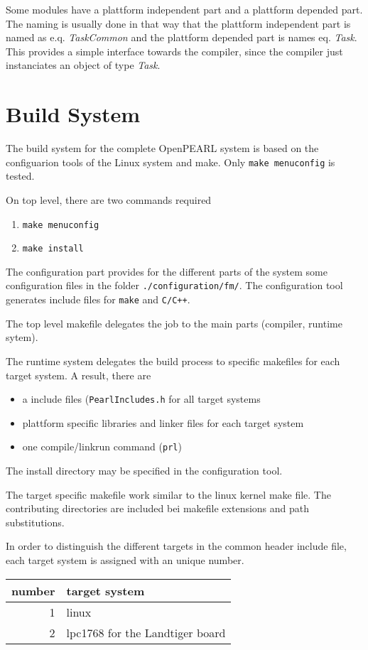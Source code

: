 Some modules have a plattform independent part and a plattform
depended part. The naming is usually done in that way that the 
plattform independent part is named as e.q. {\em TaskCommon} and the 
plattform depended part is names eq. {\em Task}. This provides a simple
interface towards the compiler, since the compiler just instanciates
an object of type {\em Task}.

\section{Build System}
The build system for the complete OpenPEARL system is based on the 
configuarion tools of the Linux system and make.
Only \texttt{make menuconfig} is tested.

On top level, there are two commands required
\begin{enumerate}
\item \texttt{make menuconfig}
\item \texttt{make install}
\end{enumerate}

The configuration part provides for the different parts of the system
some configuration files in the folder \texttt{./configuration/fm/}.
The configuration tool generates include files for \texttt{make} and
\texttt{C/C++}.

The top level makefile delegates the job to the main parts
 (compiler, runtime sytem).

The runtime system delegates the build process to specific makefiles 
for each target system. A result, there are
\begin{itemize}
\item a include files (\texttt{PearlIncludes.h} for all target systems
\item plattform specific libraries and linker files for each target system
\item one compile/linkrun command (\texttt{prl})
\end{itemize}
The install directory may be specified in the configuration tool.

The target specific makefile work similar to the linux kernel make file.
The contributing directories are included bei makefile extensions and
path substitutions.

In order to distinguish the different targets in the common header include
file, each target system is assigned with an unique number.

\begin{tabular}{|r|l|}
\hline
number & target system \\
\hline
1 & linux \\
2 & lpc1768 for the Landtiger board \\
\hline
\end{tabular}

